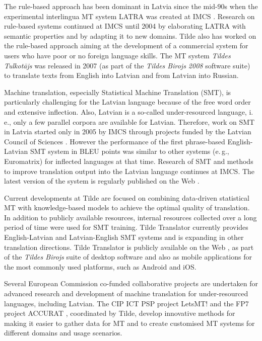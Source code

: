 \begin{multicols}{2}
The rule-based approach has been dominant in Latvia since the mid-90s when the experimental interlingua MT system LATRA was created at IMCS \cite{Meta23}.
Research on rule-based systems continued at IMCS until 2004 by elaborating LATRA with semantic properties and by adapting it to new domains.
Tilde also has worked on the rule-based approach aiming at the development of a commercial system for users who have poor or no foreign language skills.
The MT system \textit{Tildes Tulkotājs} \cite{Meta24} was released in 2007 (as part of the \textit{Tildes Birojs 2008} software suite) to translate texts from English into Latvian and from Latvian into Russian. 

Machine translation, especially Statistical Machine Translation (SMT), is particularly challenging for the Latvian language because of the free word order and extensive inflection.
Also, Latvian is a so-called under-resourced language, i.\,e., only a few parallel corpora are available for Latvian.
Therefore, work on SMT in Latvia started only in 2005 by IMCS through projects funded by the Latvian Council of Sciences \cite{Meta25, Meta26}.
However the performance of the first phrase-based English-Latvian SMT system in BLEU points was similar to other systems (e.\,g., Euromatrix) for inflected languages at that time.
Research of SMT and methods to improve translation output into the Latvian language continues at IMCS.
The latest version of the system is regularly published on the Web \cite{Meta27}.

Current developments at Tilde are focused on combining data-driven statistical MT with knowledge-based models to achieve the optimal quality of translation.
In addition to publicly available resources, internal resources collected over a long period of time were used for SMT training.
Tilde Translator currently provides English-Latvian and Latvian-English SMT systems and is expanding in other translation directions.
Tilde Translator is publicly available on the Web \cite{Meta28, Meta29}, as part of the \textit{Tildes Birojs} suite of desktop software and also as mobile applications for the most commonly used platforms, such as Android and iOS.

Several European Commission co-funded collaborative projects are undertaken for advanced research and development of machine translation for under-resourced languages, including Latvian.
The CIP ICT PSP project LetsMT! \cite{Meta30} and the FP7 project ACCURAT \cite{Meta31}, coordinated by Tilde, develop innovative methods for making it easier to gather data for MT and to create customised MT systems for different domains and usage scenarios.


\end{multicols}
